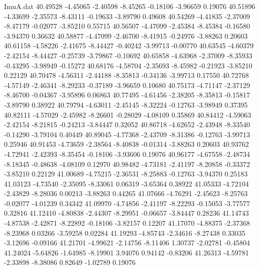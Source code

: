 \begin{filecontents}{ImuA.dat}
  40.49528   -4.45065   -2.40598   -8.45265   -0.18106   -3.96659    0.19076
  40.51896   -4.33699   -2.35573   -8.43111   -0.19633   -3.89790    0.49608
  40.54269   -4.41835   -2.37009   -8.47179   -0.02077   -3.85210    0.55715
  40.56507   -4.47099   -2.45384   -8.45384   -0.16580   -3.94370    0.36632
  40.58877   -4.47099   -2.46700   -8.41915   -0.24976   -3.88263    0.20603
  40.61158   -4.58226   -2.41675   -8.44427   -0.40242   -3.99713   -0.00770
  40.63545   -4.60379   -2.42154   -8.44427   -0.25739   -3.79867   -0.10692
  40.65858   -4.63968   -2.37009   -8.35933   -0.43295   -3.98949   -0.15272
  40.68176   -4.58704   -2.35693   -8.45982   -0.21923   -3.85210    0.22129
  40.70478   -4.56311   -2.44188   -8.35813   -0.34136   -3.99713    0.17550
  40.72768   -4.57149   -2.46341   -8.29233   -0.37189   -3.96659    0.10680
  40.75173   -4.71147   -2.37129   -8.46700   -0.04367   -3.95896    0.06863
  40.77495   -4.61456   -2.38205   -8.35813   -0.15817   -3.89790    0.38922
  40.79794   -4.63011   -2.45145   -8.32224   -0.12763   -3.98949    0.37395
  40.82111   -4.57029   -2.45982   -8.26601   -0.28029   -4.08109    0.35869
  40.84412   -4.59063   -2.42154   -8.21815   -0.24213   -3.84447    0.32052
  40.86718   -4.62652   -2.43948   -8.33540   -0.14290   -3.79104    0.40449
  40.89045   -4.77368   -2.43709   -8.31386   -0.12763   -3.99713    0.25946
  40.91453   -4.73659   -2.38564   -8.40838   -0.01314   -3.88263    0.20603
  40.93762   -4.72941   -2.42393   -8.35454   -0.18106   -3.93606    0.19076
  40.96177   -4.67558   -2.48734   -8.18345   -0.48638   -4.08109    0.12970
  40.98482   -4.73181   -2.41197   -8.20858   -0.33372   -3.85210    0.22129
  41.00689   -4.75215   -2.36531   -8.25883   -0.12763   -3.94370    0.25183
  41.03123   -4.73540   -2.35095   -8.33061    0.06319   -3.65364    0.38922
  41.05333   -4.72104   -2.43829   -8.28036    0.00213   -3.88263    0.44265
  41.07666   -4.76291   -2.45623   -8.25763   -0.02077   -4.01239    0.34342
  41.09970   -4.74856   -2.41197   -8.22293   -0.15053   -3.77577    0.32816
  41.12410   -4.80838   -2.44307   -8.29951   -0.06657   -3.84447    0.28236
  41.14743   -4.87538   -2.42871   -8.22892   -0.18106   -3.82157    0.12207
  41.17070   -4.88375   -2.37368   -8.23968    0.03266   -3.59258    0.02284
  41.19293   -4.85743   -2.34616   -8.27438    0.33035   -3.12696   -0.09166
  41.21701   -4.99621   -2.14756   -8.11406    1.30737   -2.02781   -0.45804
  41.24024   -5.64826   -1.64985   -8.19901    3.94076    0.94142   -0.83206
  41.26313   -4.59781   -2.33898   -8.38086    0.82649   -1.02789    0.19076

\end{filecontents}
